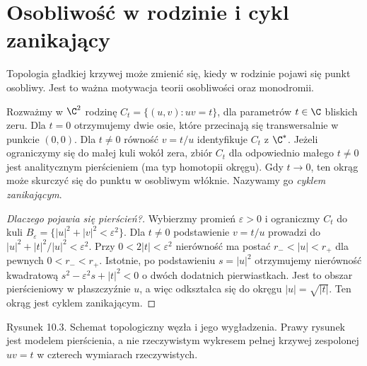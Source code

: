 \section{Osobliwość w rodzinie i cykl zanikający}
\label{sec:ga10-vanishing}

Topologia gładkiej krzywej może zmienić się, kiedy
w rodzinie pojawi się punkt osobliwy. Jest to ważna
motywacja teorii osobliwości oraz monodromii.

\begin{przyklad}
\label{prz:ga10-node}
Rozważmy w $\C^2$ rodzinę $C_t=\{(u,v):uv=t\}$,
dla parametrów $t\in\C$ bliskich zeru.
Dla $t=0$ otrzymujemy dwie osie, które przecinają się
transwersalnie w punkcie $(0,0)$. Dla $t\ne0$
równość $v=t/u$ identyfikuje $C_t$ z $\C^*$.
Jeżeli ograniczymy się do małej kuli wokół zera,
zbiór $C_t$ dla odpowiednio małego $t\ne0$ jest
analitycznym pierścieniem (ma typ homotopii okręgu).
Gdy $t\to0$, ten okrąg może skurczyć się do punktu
w osobliwym włóknie. Nazywamy go \emph{cyklem zanikającym}.
\end{przyklad}

\begin{proof}[Dlaczego pojawia się pierścień?]
Wybierzmy promień $\varepsilon>0$ i ograniczmy $C_t$
do kuli $B_\varepsilon=\{|u|^2+|v|^2<\varepsilon^2\}$.
Dla $t\ne0$ podstawienie $v=t/u$ prowadzi do
$|u|^2+|t|^2/|u|^2<\varepsilon^2$.
Przy $0<2|t|<\varepsilon^2$ nierówność ma postać
$r_-<|u|<r_+$ dla pewnych $0<r_-<r_+$.
Istotnie, po podstawieniu $s=|u|^2$ otrzymujemy
nierówność kwadratową $s^2-\varepsilon^2s+|t|^2<0$
o dwóch dodatnich pierwiastkach.
Jest to obszar pierścieniowy w płaszczyźnie $u$,
a więc odkształca się do okręgu $|u|=\sqrt{|t|}$.
Ten okrąg jest cyklem zanikającym.
\end{proof}

\begin{center}

{\small Rysunek 10.3. Schemat topologiczny węzła i jego wygładzenia.
Prawy rysunek jest modelem pierścienia, a nie rzeczywistym wykresem
pełnej krzywej zespolonej $uv=t$ w czterech wymiarach rzeczywistych.}\par
\end{center}

